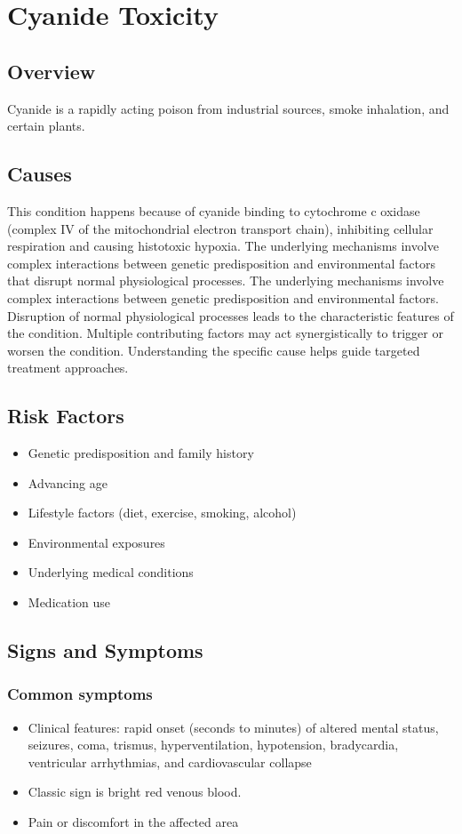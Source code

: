 \chapter{Cyanide Toxicity}
\label{sec:Cyanide Toxicity}

\section{Overview}
Cyanide is a rapidly acting poison from industrial sources, smoke inhalation, and certain plants.
\section{Causes}
This condition happens because of cyanide binding to cytochrome c oxidase (complex IV of the mitochondrial electron transport chain), inhibiting cellular respiration and causing histotoxic hypoxia. The underlying mechanisms involve complex interactions between genetic predisposition and environmental factors that disrupt normal physiological processes. The underlying mechanisms involve complex interactions between genetic predisposition and environmental factors. Disruption of normal physiological processes leads to the characteristic features of the condition. Multiple contributing factors may act synergistically to trigger or worsen the condition. Understanding the specific cause helps guide targeted treatment approaches.
\section{Risk Factors}


\begin{itemize}[noitemsep]
  \item Genetic predisposition and family history
  \item Advancing age
  \item Lifestyle factors (diet, exercise, smoking, alcohol)
  \item Environmental exposures
  \item Underlying medical conditions
  \item Medication use
\end{itemize}
\section{Signs and Symptoms}

\subsection{Common symptoms}
\begin{itemize}[noitemsep]
  \item Clinical features: rapid onset (seconds to minutes) of altered mental status, seizures, coma, trismus, hyperventilation, hypotension, bradycardia, ventricular arrhythmias, and cardiovascular collapse
  \item Classic sign is bright red venous blood.
  \item Pain or discomfort in the affected area
  \end{itemize}

